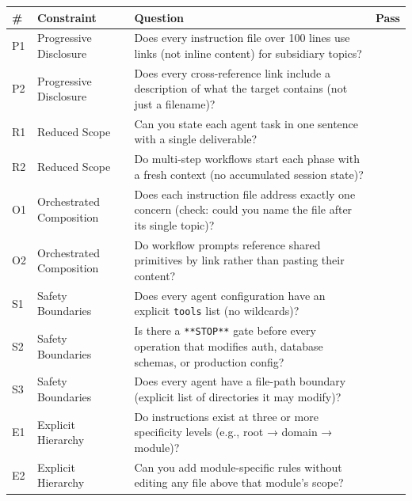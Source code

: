 \documentclass[
  a4paper,
  DIV=11,
  numbers=noendperiod]{scrreprt}
\newcounter{none} %
\begin{document}
{\def\LTcaptype{none} %
\begin{longtable}[]{@{}
  >{\raggedright\arraybackslash}p{}
  >{\raggedright\arraybackslash}p{}
  >{\raggedright\arraybackslash}p{}
  >{\raggedright\arraybackslash}p{}@{}}
\toprule\noalign{}
\begin{minipage}[b]{\linewidth}\raggedright
\#
\end{minipage} & \begin{minipage}[b]{\linewidth}\raggedright
Constraint
\end{minipage} & \begin{minipage}[b]{\linewidth}\raggedright
Question
\end{minipage} & \begin{minipage}[b]{\linewidth}\raggedright
Pass
\end{minipage} \\
\midrule\noalign{}
\endhead
\bottomrule\noalign{}
\endlastfoot
P1 & Progressive Disclosure & Does every instruction file over 100 lines
use links (not inline content) for subsidiary topics? & \\
P2 & Progressive Disclosure & Does every cross-reference link include a
description of what the target contains (not just a filename)? & \\
R1 & Reduced Scope & Can you state each agent task in one sentence with
a single deliverable? & \\
R2 & Reduced Scope & Do multi-step workflows start each phase with a
fresh context (no accumulated session state)? & \\
O1 & Orchestrated Composition & Does each instruction file address
exactly one concern (check: could you name the file after its single
topic)? & \\
O2 & Orchestrated Composition & Do workflow prompts reference shared
primitives by link rather than pasting their content? & \\
S1 & Safety Boundaries & Does every agent configuration have an explicit
\texttt{tools} list (no wildcards)? & \\
S2 & Safety Boundaries & Is there a \texttt{**STOP**} gate before every
operation that modifies auth, database schemas, or production config?
& \\
S3 & Safety Boundaries & Does every agent have a file-path boundary
(explicit list of directories it may modify)? & \\
E1 & Explicit Hierarchy & Do instructions exist at three or more
specificity levels (e.g., root → domain → module)? & \\
E2 & Explicit Hierarchy & Can you add module-specific rules without
editing any file above that module's scope? & \\
\end{longtable}
}
\end{document}
